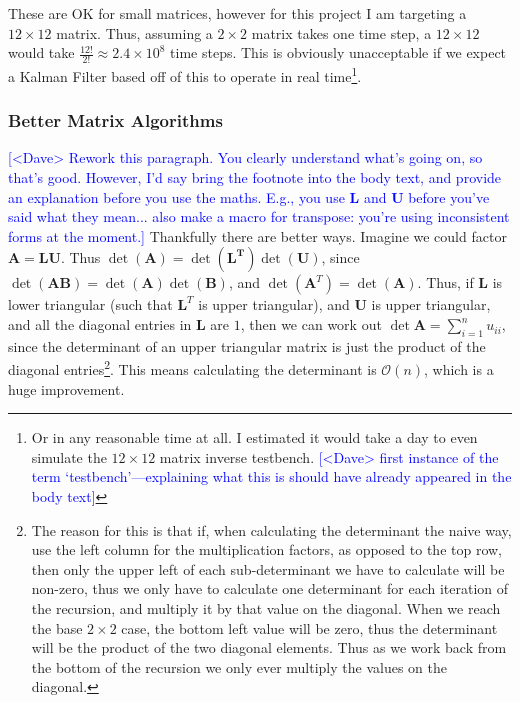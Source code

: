 \documentclass[12pt]{article}
\newcommand{\note}[2][red]{\textcolor{#1}{#2}}
\newcommand{\notedme}[1]{\note[blue]{[<Dave> #1]}}
\begin{document}
These are OK for small matrices, however for this project I am targeting a $12 \times 12$ matrix. Thus, assuming a $2\times2$ matrix takes one time step, a $12 \times 12$ would take $\frac{12!}{2!} \approx 2.4 \times 10^8$ time steps. This is obviously unacceptable if we expect a Kalman Filter based off of this to operate in real time\footnote{Or in any reasonable time at all. I estimated it would take a day to even simulate the $12\times12$ matrix inverse testbench. \notedme{first instance of the term `testbench'---explaining what this is should have already appeared in the body text}}.

\subsubsection{Better Matrix Algorithms}
\label{lu}

\notedme{Rework this paragraph. You clearly understand what's going on, so that's good. However, I'd say bring the footnote into the body text, and provide an explanation before you use the maths. E.g., you use $\mathbf{L}$ and $\mathbf{U}$ before you've said what they mean... also make a macro for transpose: you're using inconsistent forms at the moment.}
Thankfully there are better ways. Imagine we could factor $\mathbf{A} = \mathbf{L}\mathbf{U}$. Thus $\det(\mathbf{A}) = \det(\mathbf{L^T}) \det(\mathbf{U})$, since $\det(\mathbf{AB}) = \det(\mathbf{A}) \det(\mathbf{B})$, and $\det(\mathbf{A}^T) = \det(\mathbf{A})$. Thus,  if $\mathbf{L}$ is lower triangular (such that $\mathbf{L}^T$ is upper triangular), and $\mathbf{U}$ is upper triangular, and all the diagonal entries in $\mathbf{L}$ are $1$, then we can work out $\det{\mathbf{A}}=\sum_{i=1}^{n}u_{ii}$, since the determinant of an upper triangular matrix is just the product of the diagonal entries\footnote{The reason for this is that if, when calculating the determinant the naive way, use the left column for the multiplication factors, as opposed to the top row, then only the upper left of each sub-determinant we have to calculate will be non-zero, thus we only have to calculate one determinant for each iteration of the recursion, and multiply it by that value on the diagonal. When we reach the base $2\times2$ case, the bottom left value will be zero, thus the determinant will be the product of the two diagonal elements. Thus as we work back from the bottom of the recursion we only ever multiply the values on the diagonal.}. This means calculating the determinant is $\mathcal{O}(n)$, which is a huge improvement.
\end{document}
